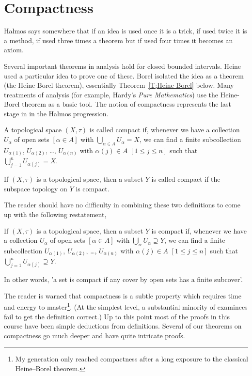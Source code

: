 \section{Compactness} Halmos says somewhere that if
an idea is used once it is a trick, if used twice it
is a method, if used three times a theorem but if used
four times it becomes an axiom.

Several important theorems in analysis
hold for closed bounded intervals. Heine
used a particular idea to prove one of
these. Borel isolated the idea as a theorem
(the Heine-Borel theorem), essentially 
Theorem~\ref{T;Heine-Borel} below.
Many treatments of analysis (for example,
Hardy's \emph{Pure Mathematics}) use the 
Heine-Borel theorem as a basic tool.
The notion of compactness represents the last stage in
in the Halmos progression.

\begin{definition}\label{D;compact} 
A topological space $(X,\tau)$
is called compact if, whenever we have a collection
$U_{\alpha}$ of open sets $[\alpha\in A]$
with $\bigcup_{\alpha\in A}U_{\alpha}=X$, we can find a
finite subcollection $U_{\alpha(1)}$,
$U_{\alpha(2)}$, \dots, $U_{\alpha(n)}$
with $\alpha(j)\in A$ $[1\leq j\leq n]$
such that $\bigcup_{j=1}^{n}U_{\alpha(j)}=X$.
\end{definition}
\begin{definition} If $(X,\tau)$ is a topological space,
then a subset $Y$ is called compact if the subspace topology
on $Y$ is compact.
\end{definition}
The reader should have no difficulty in combining
these two definitions to come up with the
following restatement,
\begin{lemma}\label{L;compact equivalence} If $(X,\tau)$ 
is a topological space,
then a subset $Y$ is compact if, whenever we have a collection
$U_{\alpha}$ of open sets $[\alpha\in A]$
with $\bigcup_{\alpha}U_{\alpha}\supseteq Y$, we can find a
finite subcollection $U_{\alpha(1)}$,
$U_{\alpha(2)}$, \dots, $U_{\alpha(n)}$
with $\alpha(j)\in A$ $[1\leq j\leq n]$
such that $\bigcup_{j=1}^{n}U_{\alpha(j)}\supseteq Y$.
\end{lemma}
In other words, 'a set is compact if any cover by
open sets has a finite subcover'.

The reader is warned that compactness is a subtle
property which requires time and energy 
to master\footnote{My generation only reached compactness 
after a long exposure to the classical Heine--Borel
theorem.}.
(At the simplest level, a substantial minority
of examinees fail to get the definition correct.)
Up to this point most of the proofs in this course
have been simple deductions from
definitions. Several of our theorems
on compactness go much deeper and have quite intricate proofs.

